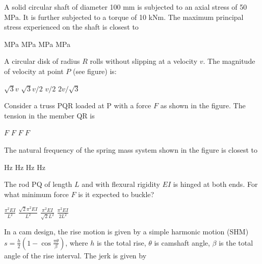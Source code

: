 \documentclass[addpoints,11pt]{exam}
\begin{document}
\begin{questions}
        \question A solid circular shaft of diameter 100 mm is subjected to an axial stress of 50 MPa. It is further subjected to a torque of 10 kNm. The maximum principal stress experienced on the shaft is closest to

        \begin{oneparchoices}
             MPa
             MPa
             MPa
             MPa
        \end{oneparchoices}

        \question A circular disk of radius $R$ rolls without slipping at a velocity $v$. The magnitude of velocity at point $P$ (see figure) is: %

        \begin{oneparchoices}
            \choice $\sqrt{3}v$
            \choice $\sqrt{3}v/2$
            \choice $v/2$
            \choice $2v/\sqrt{3}$
        \end{oneparchoices}

        \question Consider a truss PQR loaded at P with a force $F$ as shown in the figure. %
        The tension in the member QR is

        \begin{oneparchoices}
             $F$
             $F$
             $F$
             $F$
        \end{oneparchoices}

        \question The natural frequency of the spring mass system shown in the figure is closest to %

        \begin{oneparchoices}
             Hz
             Hz
             Hz
             Hz
        \end{oneparchoices}

        \question The rod PQ of length $L$ and with flexural rigidity $EI$ is hinged at both ends. For what minimum force $F$ is it expected to buckle?

        \begin{oneparchoices}
            \choice $\frac{\pi^2EI}{L^2}$
            \choice $\frac{\sqrt{2}\pi^2EI}{L^2}$
            \choice $\frac{\pi^2EI}{\sqrt{2}L^2}$
            \choice $\frac{\pi^2EI}{2L^2}$
        \end{oneparchoices}

        \question In a cam design, the rise motion is given by a simple harmonic motion (SHM) $s=\frac{h}{2}(1-\cos\frac{\pi\theta}{\beta})$, where $h$ is the total rise, $\theta$ is camshaft angle, $\beta$ is the total angle of the rise interval. The jerk is given by


\end{questions}
\end{document}
